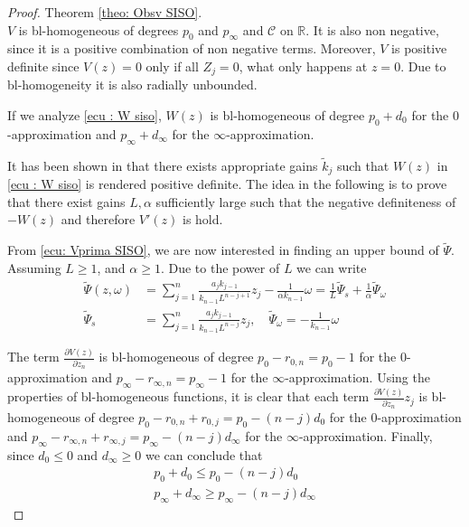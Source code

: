 \documentclass[11pt,letterpaper,twoside,openright]{report}
\newcommand{\RE}{\mathbb{R}}
\begin{document}
\begin{proof}{Theorem \ref{theo: Obsv SISO}. \\}
 	$V$ is bl-homogeneous of degrees $p_0$ and $p_{\infty}$ and $\mathcal{C}$ on $\RE$. It is also non negative, since it is a positive combination of non negative terms. Moreover, $V$ is positive	definite since $V(z) = 0$ only if all $Z_j = 0$, what only happens at $z = 0$. Due to bl-homogeneity it is also radially unbounded.
 	
 	If we analyze \eqref{ecu : W siso}, $W(z)$ is bl-homogeneous of degree $p_0+d_0$ for the $0$-approximation and $p_{\infty}+d_{\infty}$ for the $\infty$-approximation.
 	
 	It has been shown in \cite{Moreno2021} that there exists appropriate gains $\tilde{k}_j$ such that $W(z)$ in \eqref{ecu : W siso} is rendered positive definite. The idea in the following is to prove that there exist gains $L,\alpha$ sufficiently large such that the negative definiteness of $-W(z)$ and therefore $V'(z)$ is hold.
 	
 	From \eqref{ecu: Vprima SISO}, we are now interested in finding an upper bound of $\tilde{\Psi}$. Assuming $L\geq 1$, and $\alpha \geq 1$. Due to the power of $L$ we can write 
 	\begin{equation}
 		\begin{split}
 			\tilde{\Psi}(z,\omega) &= \sum_{j=1}^{n}\frac{a_{j}k_{j-1}}{k_{n-1}L^{n-j+1}} z_{j} - \frac{1}{\alpha k_{n-1}}\omega = \frac{1}{L}\tilde{\Psi}_s + \frac{1}{\alpha}\tilde{\Psi}_{\omega} \\
 			\tilde{\Psi}_s &= \sum_{j=1}^{n}\frac{a_{j}k_{j-1}}{k_{n-1}L^{n-j}} z_{j}, \quad \tilde{\Psi}_{\omega} = -\frac{1}{k_{n-1}}\omega
 		\end{split} 
 	\end{equation}
	
	The term $\frac{\partial V(z)}{\partial z_{n}}$ is bl-homogeneous of degree $p_0-r_{0,n}=p_0-1$ for the $0$-approximation and $p_{\infty}-r_{\infty,n}=p_{\infty}-1$ for the $\infty$-approximation.	Using the properties of bl-homogeneous functions, it is clear that each term $\frac{\partial V(z)}{\partial z_{n}}z_j$ is bl-homogeneous of degree $p_0-r_{0,n}+r_{0,j}=p_0-(n-j)d_0$ for the $0$-approximation and $p_{\infty}-r_{\infty,n}+r_{\infty,j}=p_\infty-(n-j)d_\infty$ for the $\infty$-approximation. Finally, since $d_0 \leq 0$ and $d_{\infty} \geq 0$ we can conclude that
	\begin{equation}
		\begin{split}
			p_0+d_0 \leq p_0-(n-j)d_0 \\
			p_{\infty}+d_{\infty} \geq p_\infty-(n-j)d_\infty
		\end{split}		
	\end{equation} 


\end{proof}
\end{document}
